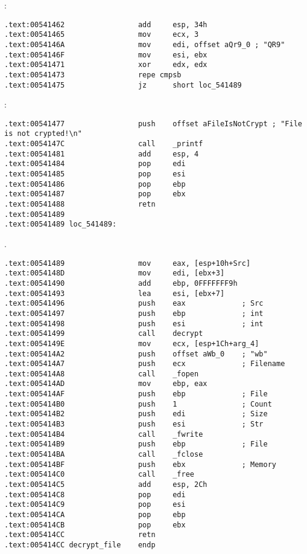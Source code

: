 :

\begin{lstlisting}
.text:00541462                 add     esp, 34h
.text:00541465                 mov     ecx, 3
.text:0054146A                 mov     edi, offset aQr9_0 ; "QR9"
.text:0054146F                 mov     esi, ebx
.text:00541471                 xor     edx, edx
.text:00541473                 repe cmpsb
.text:00541475                 jz      short loc_541489
\end{lstlisting}

:

\begin{lstlisting}
.text:00541477                 push    offset aFileIsNotCrypt ; "File is not crypted!\n"
.text:0054147C                 call    _printf
.text:00541481                 add     esp, 4
.text:00541484                 pop     edi
.text:00541485                 pop     esi
.text:00541486                 pop     ebp
.text:00541487                 pop     ebx
.text:00541488                 retn
.text:00541489
.text:00541489 loc_541489:
\end{lstlisting}

 .

\begin{lstlisting}
.text:00541489                 mov     eax, [esp+10h+Src]
.text:0054148D                 mov     edi, [ebx+3]
.text:00541490                 add     ebp, 0FFFFFFF9h
.text:00541493                 lea     esi, [ebx+7]
.text:00541496                 push    eax             ; Src
.text:00541497                 push    ebp             ; int
.text:00541498                 push    esi             ; int
.text:00541499                 call    decrypt
.text:0054149E                 mov     ecx, [esp+1Ch+arg_4]
.text:005414A2                 push    offset aWb_0    ; "wb"
.text:005414A7                 push    ecx             ; Filename
.text:005414A8                 call    _fopen
.text:005414AD                 mov     ebp, eax
.text:005414AF                 push    ebp             ; File
.text:005414B0                 push    1               ; Count
.text:005414B2                 push    edi             ; Size
.text:005414B3                 push    esi             ; Str
.text:005414B4                 call    _fwrite
.text:005414B9                 push    ebp             ; File
.text:005414BA                 call    _fclose
.text:005414BF                 push    ebx             ; Memory
.text:005414C0                 call    _free
.text:005414C5                 add     esp, 2Ch
.text:005414C8                 pop     edi
.text:005414C9                 pop     esi
.text:005414CA                 pop     ebp
.text:005414CB                 pop     ebx
.text:005414CC                 retn
.text:005414CC decrypt_file    endp
\end{lstlisting}

